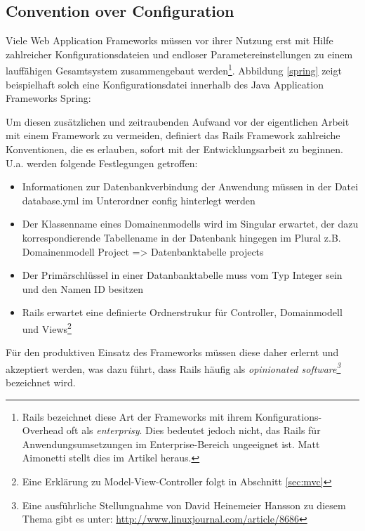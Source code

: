 \subsection{Convention over Configuration}
Viele Web Application Frameworks müssen vor ihrer Nutzung erst mit Hilfe zahlreicher Konfigurationsdateien und endloser Parametereinstellungen zu einem lauffähigen Gesamtsystem zusammengebaut werden\footnote{Rails bezeichnet diese Art der Frameworks mit ihrem Konfigurations-Overhead oft als \emph{enterprisy}. Dies bedeutet jedoch nicht, das Rails für Anwendungsumsetzungen im Enterprise-Bereich ungeeignet ist. Matt Aimonetti stellt dies im Artikel \cite{enterprisy} heraus.}. Abbildung \ref{spring} zeigt beispielhaft solch eine Konfigurationsdatei innerhalb des Java Application Frameworks Spring:



Um diesen zusätzlichen und zeitraubenden Aufwand vor der eigentlichen Arbeit mit einem Framework zu vermeiden, definiert das Rails Framework zahlreiche Konventionen, die es erlauben, sofort mit der Entwicklungsarbeit zu beginnen. U.a. werden folgende Festlegungen getroffen:

\begin{itemize}
\item
Informationen zur Datenbankverbindung der Anwendung müssen in der Datei database.yml im Unterordner config hinterlegt werden
\item
Der Klassenname eines Domainenmodells wird im Singular erwartet, der dazu korrespondierende Tabellename in der Datenbank hingegen im Plural z.B. Domainenmodell Project => Datenbanktabelle projects
\item
Der Primärschlüssel in einer Datanbanktabelle muss vom Typ Integer sein und den Namen ID besitzen
\item
Rails erwartet eine definierte Ordnerstrukur für Controller, Domainmodell und Views\footnote{Eine Erklärung zu Model-View-Controller folgt in Abschnitt \ref{sec:mvc}}
\end{itemize}
Für den produktiven Einsatz des Frameworks müssen diese daher erlernt und akzeptiert werden, was dazu führt, dass Rails häufig als \emph{opinionated software\footnote{Eine ausführliche Stellungnahme von David Heinemeier Hansson zu diesem Thema gibt es unter: \href{http://www.linuxjournal.com/article/8686}{http://www.linuxjournal.com/article/8686}}} bezeichnet wird.

